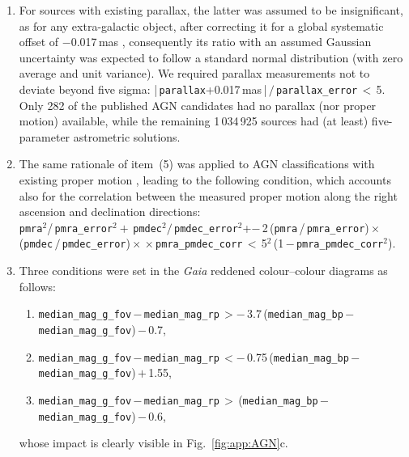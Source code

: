 \documentclass[longauth]{aa}
\def\gaia{\textit{Gaia}\xspace}
\begin{document}
\begin{enumerate}
    \item For sources with existing parallax, the latter was assumed to be insignificant, as for any extra-galactic object, after correcting it for a global systematic offset of $-$0.017\,mas \citep{2021A&A...649A...4L}, consequently its ratio with an assumed Gaussian uncertainty was expected to follow a standard normal distribution (with zero average and unit variance). We required parallax measurements not to deviate beyond five sigma: |\,\texttt{parallax}+0.017\,mas\,|\,$/$\,\texttt{parallax\_error}\,$<$\,5. Only 282 of the published AGN candidates had no parallax (nor proper motion) available, while the remaining 1\,034\,925 sources had (at least) five-parameter astrometric solutions.
    \item The same rationale of item~(5) was applied to AGN classifications with existing proper motion \citep[with negligible  offset; see][]{2021A&A...649A...4L,EDR3-DPACP-133}, leading to the following condition, which accounts also for the correlation between the measured proper motion along the right ascension and declination directions: \\ \texttt{pmra}$^2$/\,\texttt{pmra\_error}$^2+$\,\texttt{pmdec}$^2/$\,\texttt{pmdec\_error}$^2$+\newline $-$\,2\,(\texttt{pmra}\,/\,\texttt{pmra\_error})\,$\times$\,(\texttt{pmdec}\,$/$\,\texttt{pmdec\_error})\,$\times$\newline
    $\times$\,\texttt{pmra\_pmdec\_corr}\,$<$\,5$^2$\,(1\,$-$\,\texttt{pmra\_pmdec\_corr}$^2$).
    \item Three conditions were set in the \gaia reddened colour--colour diagrams as follows: 
    \begin{enumerate} 
        \item \texttt{median\_mag\_g\_fov}\,$-$\,\texttt{median\_mag\_rp}\,$>$\break $-$\,3.7\,(\texttt{median\_mag\_bp}\,$-$\,\texttt{median\_mag\_g\_fov})\,$-$\,0.7,
        \item \texttt{median\_mag\_g\_fov}\,$-$\,\texttt{median\_mag\_rp}\,$<$\break $-$\,0.75\,(\texttt{median\_mag\_bp}\,$-$\,\texttt{median\_mag\_g\_fov})\,$+$\,1.55,
        \item \texttt{median\_mag\_g\_fov}\,$-$\,\texttt{median\_mag\_rp}\,$>$\,(\texttt{median\_mag\_bp}\,$-$\,\texttt{median\_mag\_g\_fov})\,$-$\,0.6,
    \end{enumerate}
    whose impact is clearly visible in Fig.~\ref{fig:app:AGN}c.
\end{enumerate}
\end{document}
